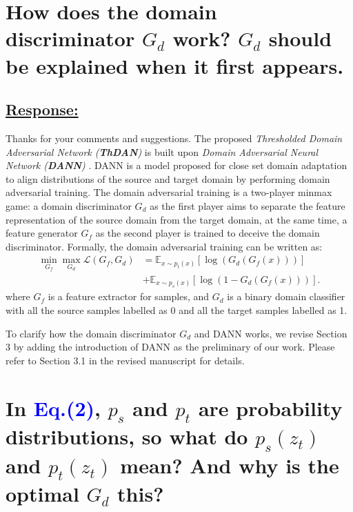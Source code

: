 \section{How does the domain discriminator $G_d$ work? $G_d$ should be explained when it first appears.}

\subsection*{\underline{\textbf{Response:}}}


Thanks for your comments and suggestions. 
The proposed \textit{Thresholded Domain Adversarial Network (\textbf{ThDAN})} is built upon \textit{Domain Adversarial Neural Network (\textbf{DANN})} \cite{DomainAdversrialNetwork}. 
DANN is a model proposed for close set domain adaptation to align distributions of the source and target domain by performing domain adversarial training. 
The domain adversarial training is a two-player minmax game: 
a domain discriminator $G_d$ as the first player aims to separate the feature representation of the source domain from the target domain, at the same time, a feature generator $G_f$ as the second player is trained to deceive the domain discriminator. 
Formally, the domain adversarial training can be written as:
\begin{equation}
    \label{eq: training DANN}
    \begin{split}
        \min_{G_f} \max_{G_d} \mathscr{L}(G_f,G_d) &=\mathbb{E}_{x\sim p_t(x)} \left[ \log \left(G_d\left(G_f\left(x\right)\right)\right) \right]\\
        &+\mathbb{E}_{x\sim p_s(x)}\left[ \log \left(1-G_d\left(G_f\left(x\right)\right)\right) \right].
    \end{split}
\end{equation}
where $G_f$ is a feature extractor for samples, and $G_d$ is a binary domain classifier with all the source samples labelled as 0 and all the target samples labelled as 1.

To clarify how the domain discriminator $G_d$ and DANN works, we revise Section 3 by adding the introduction of DANN as the preliminary of our work. 
Please refer to Section 3.1 in the revised manuscript for details.


\section{In \textcolor{blue}{Eq.(2)}, $p_s$ and $p_t$ are probability distributions, so what do $p_s (z_t)$ and $p_t (z_t)$ mean? And why is the optimal $G_d$ this? }


